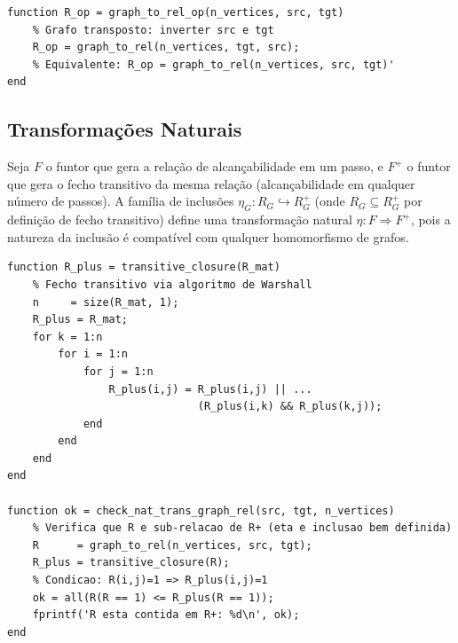 \begin{lstlisting}[style=matlab, caption={Funtor contravariante $F^*$ --- grafo transposto}]
function R_op = graph_to_rel_op(n_vertices, src, tgt)
    % Grafo transposto: inverter src e tgt
    R_op = graph_to_rel(n_vertices, tgt, src);
    % Equivalente: R_op = graph_to_rel(n_vertices, src, tgt)'
end
\end{lstlisting}

\subsection{Transformações Naturais}

\begin{definition}
Seja $F$ o funtor que gera a relação de alcançabilidade em um passo, e $F^{+}$ o funtor que gera o fecho transitivo da mesma relação (alcançabilidade em qualquer número de passos). A família de inclusões $\eta_{G}: R_G \hookrightarrow R_G^{+}$ (onde $R_G \subseteq R_G^{+}$ por definição de fecho transitivo) define uma transformação natural $\eta: F \Rightarrow F^{+}$, pois a natureza da inclusão é compatível com qualquer homomorfismo de grafos.
\end{definition}

\begin{lstlisting}[style=matlab, caption={Transformação natural $\eta: F \Rightarrow F^{+}$ --- fecho transitivo}]
function R_plus = transitive_closure(R_mat)
    % Fecho transitivo via algoritmo de Warshall
    n     = size(R_mat, 1);
    R_plus = R_mat;
    for k = 1:n
        for i = 1:n
            for j = 1:n
                R_plus(i,j) = R_plus(i,j) || ...
                              (R_plus(i,k) && R_plus(k,j));
            end
        end
    end
end

function ok = check_nat_trans_graph_rel(src, tgt, n_vertices)
    % Verifica que R e sub-relacao de R+ (eta e inclusao bem definida)
    R      = graph_to_rel(n_vertices, src, tgt);
    R_plus = transitive_closure(R);
    % Condicao: R(i,j)=1 => R_plus(i,j)=1
    ok = all(R(R == 1) <= R_plus(R == 1));
    fprintf('R esta contida em R+: %d\n', ok);
end
\end{lstlisting}
